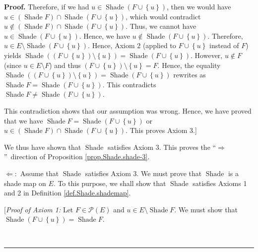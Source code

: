 \documentclass[numbers=enddot,12pt,final,onecolumn]{scrartcl}%
\theoremstyle{definition}
\newenvironment{proof}[1][Proof]{\noindent\textbf{#1.} }{\ \rule{0.5em}{0.5em}}
\newenvironment{verlong}{}{}
\begin{document}
\begin{verlong}
\begin{proof}
Therefore, if we had $u\in\operatorname*{Shade}\left(  F\cup\left\{
u\right\}  \right)  $, then we would have $u\in\left(  \operatorname*{Shade}%
F\right)  \cap\operatorname*{Shade}\left(  F\cup\left\{  u\right\}  \right)
$, which would contradict $u\notin\left(  \operatorname*{Shade}F\right)
\cap\operatorname*{Shade}\left(  F\cup\left\{  u\right\}  \right)  $. Thus, we
cannot have $u\in\operatorname*{Shade}\left(  F\cup\left\{  u\right\}
\right)  $. Hence, we have $u\notin\operatorname*{Shade}\left(  F\cup\left\{
u\right\}  \right)  $. Therefore, $u\in E\setminus\operatorname*{Shade}\left(
F\cup\left\{  u\right\}  \right)  $. Hence, Axiom 2 (applied to $F\cup\left\{
u\right\}  $ instead of $F$) yields $\operatorname*{Shade}\left(  \left(
F\cup\left\{  u\right\}  \right)  \setminus\left\{  u\right\}  \right)
=\operatorname*{Shade}\left(  F\cup\left\{  u\right\}  \right)  $. However,
$u\notin F$ (since $u\in E\setminus F$) and thus $\left(  F\cup\left\{
u\right\}  \right)  \setminus\left\{  u\right\}  =F$. Hence, the equality
$\operatorname*{Shade}\left(  \left(  F\cup\left\{  u\right\}  \right)
\setminus\left\{  u\right\}  \right)  =\operatorname*{Shade}\left(
F\cup\left\{  u\right\}  \right)  $ rewrites as $\operatorname*{Shade}%
F=\operatorname*{Shade}\left(  F\cup\left\{  u\right\}  \right)  $. This
contradicts $\operatorname*{Shade}F\neq\operatorname*{Shade}\left(
F\cup\left\{  u\right\}  \right)  $.

This contradiction shows that our assumption was wrong. Hence, we have proved
that we have $\operatorname*{Shade}F=\operatorname*{Shade}\left(
F\cup\left\{  u\right\}  \right)  $ or $u\in\left(  \operatorname*{Shade}%
F\right)  \cap\operatorname*{Shade}\left(  F\cup\left\{  u\right\}  \right)
$. This proves Axiom 3.]

We thus have shown that $\operatorname*{Shade}$ satisfies Axiom 3. This proves
the \textquotedblleft$\Longrightarrow$\textquotedblright\ direction of
Proposition \ref{prop.Shade.shade-3}.

$\Longleftarrow:$ Assume that $\operatorname*{Shade}$ satisfies Axiom 3. We
must prove that $\operatorname*{Shade}$ is a shade map on $E$. To this
purpose, we shall show that $\operatorname*{Shade}$ satisfies Axioms 1 and 2
in Definition \ref{def.Shade.shademap}.

[\textit{Proof of Axiom 1:} Let $F\in\mathcal{P}\left(  E\right)  $ and $u\in
E\setminus\operatorname*{Shade}F$. We must show that $\operatorname*{Shade}%
\left(  F\cup\left\{  u\right\}  \right)  =\operatorname*{Shade}F$.


\end{proof}
\end{verlong}
\end{document}
